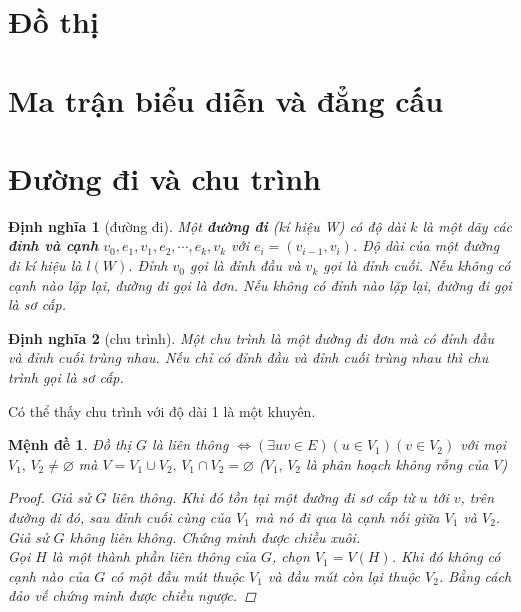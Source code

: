 \documentclass[14pt]{extarticle}
\newtheorem{definition}{Định nghĩa}[section]
\newtheorem{proposition}{Mệnh đề}[section]
\begin{document}
\tableofcontents\pagebreak


\section{Đồ thị}


\section{Ma trận biểu diễn và đẳng cấu}


\section{Đường đi và chu trình}
\begin{definition}[đường đi]
	\label{def:duong-di}
	Một \textbf{đường đi} (kí hiệu W) có độ dài $k$ là một dãy các \textbf{đỉnh và cạnh} $v_0, e_1, v_1, e_2,\cdots,e_k,v_k$ với $e_i = (v_{i-1},v_i)$. Độ dài của một đường đi kí hiệu là $l(W)$. Đỉnh $v_0$ gọi là đỉnh đầu và $v_k$ gọi là đỉnh cuối. Nếu không có cạnh nào lặp lại, đường đi gọi là đơn. Nếu không có đỉnh nào lặp lại, đường đi gọi là sơ cấp.
\end{definition}
\begin{definition}[chu trình]
	\label{def:chu-trinh}
	 Một chu trình là một đường đi đơn mà có đỉnh đầu và đỉnh cuối trùng nhau. Nếu chỉ có đỉnh đầu và đỉnh cuối trùng nhau thì chu trình gọi là sơ cấp.
\end{definition}
Có thể thấy chu trình với độ dài 1 là một khuyên.
\begin{proposition}
	Đồ thị $G$ là liên thông $\iff ({\exists uv \in E})({ u\in V_1})({v \in V_2})$ với mọi $V_1,\,V_2 \ne \varnothing$ mà $V = V_1\cup V_2,\, V_1 \cap V_2 = \varnothing$ ($V_1,\,V_2$ là phân hoạch không rỗng của $V$)
	\begin{proof}
		Giả sử $G$ liên thông. Khi đó tồn tại một đường đi sơ cấp từ $u$ tới $v$, trên đường đi đó, sau đỉnh cuối cùng của $V_1$ mà nó đi qua là cạnh nối giữa $V_1$ và $V_2$. Giả sử $G$ không liên không. Chứng minh được chiều xuôi.\\
		Gọi $H$ là một thành phần liên thông của $G$, chọn $V_1 = V(H)$. Khi đó không có cạnh nào của $G$ có một đầu mút thuộc $V_1$ và đầu mút còn lại thuộc $V_2$. Bằng cách đảo vế chứng minh được chiều ngược.
	\end{proof}
\end{proposition}
\end{document}
